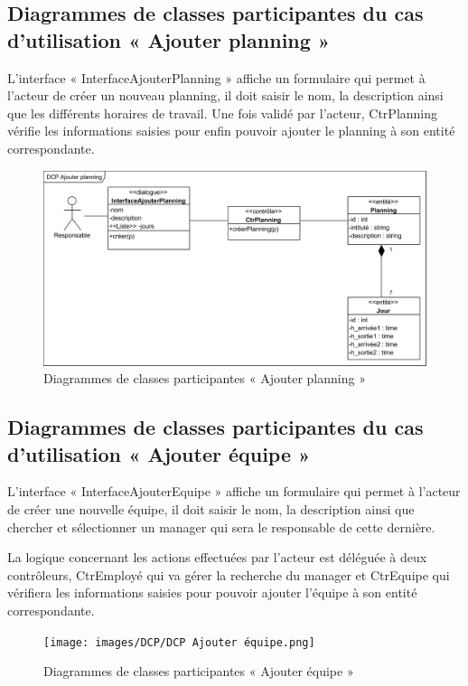 \begin{itemize}
        \subsection*{Diagrammes de classes participantes du cas d'utilisation « Ajouter planning »}
           L’interface « InterfaceAjouterPlanning » affiche un formulaire qui permet à l’acteur de créer un nouveau planning, il doit saisir le nom, la description ainsi que les différents horaires de travail.
           Une fois validé par l’acteur, CtrPlanning vérifie les informations saisies pour enfin pouvoir ajouter le planning à son entité correspondante.
            \begin{figure}[h!]
                 \centering
                \includegraphics[scale=0.88]{images/DCP/DCP Ajouter planning.png}
                 \caption{Diagrammes de classes participantes « Ajouter planning »}
                 \label{fig28}
            \end{figure}
        
        \subsection*{Diagrammes de classes participantes du cas d'utilisation « Ajouter équipe »}
        L’interface « InterfaceAjouterEquipe » affiche un formulaire qui permet à l’acteur de créer une nouvelle équipe, il doit saisir le nom, la description ainsi que chercher et sélectionner un manager qui sera le responsable de cette dernière.
        
        La logique concernant les actions effectuées par l’acteur est déléguée à deux contrôleurs, CtrEmployé qui va gérer la recherche du manager et CtrEquipe qui vérifiera les informations saisies pour pouvoir ajouter l’équipe à son entité correspondante.
        \clearpage
            \begin{figure}[h!]
                 \centering
                \texttt{[image: images/DCP/DCP Ajouter équipe.png]}
                 \caption{Diagrammes de classes participantes « Ajouter équipe »}
                 \label{fig29}
            \end{figure}
            

\end{itemize}
